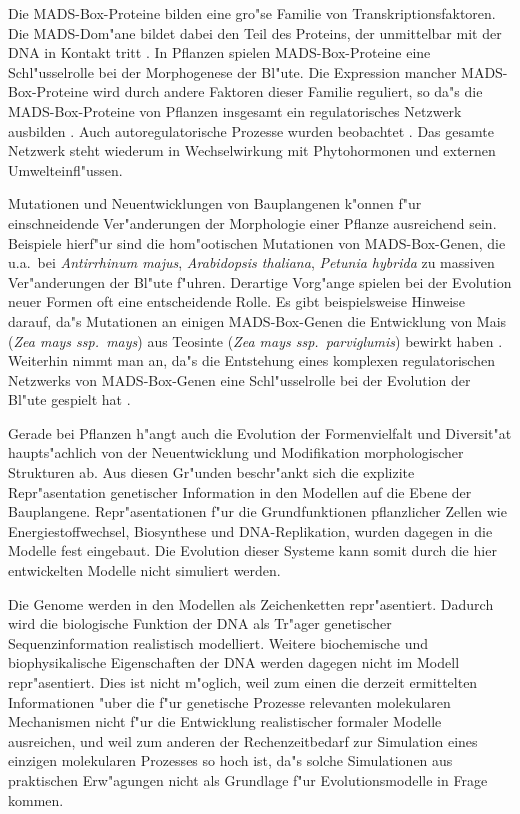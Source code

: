 Die MADS-Box-Proteine bilden eine gro"se Familie von Transkriptionsfaktoren.
Die MADS-Dom"ane bildet dabei den Teil des Proteins, der unmittelbar mit der DNA in Kontakt tritt \cite{Pellegrini95}.
In Pflanzen spielen MADS-Box-Proteine eine Schl"usselrolle bei der Morphogenese der Bl"ute.
Die Expression mancher MADS-Box-Proteine wird durch andere Faktoren dieser Familie reguliert, so da"s die MADS-Box-Proteine
von Pflanzen insgesamt ein regulatorisches Netzwerk ausbilden \cite{Theissen95}. Auch autoregulatorische
Prozesse wurden beobachtet \cite{Troebner92}. Das gesamte Netzwerk steht wiederum in Wechselwirkung mit Phytohormonen und externen
Umwelteinfl"ussen.

Mutationen und Neuentwicklungen von Bauplangenen
k"onnen f"ur einschneidende Ver"anderungen der Morphologie einer Pflanze
ausreichend sein. Beispiele hierf"ur sind die hom"ootischen
Mutationen von MADS-Box-Genen, die u.a.\ bei {\slshape Antirrhinum majus},
{\slshape Arabidopsis thaliana}, {\slshape Petunia hybrida} zu massiven
Ver"anderungen der Bl"ute f"uhren.
Derartige Vorg"ange spielen bei der Evolution neuer Formen oft eine entscheidende
Rolle. Es gibt beispielsweise Hinweise darauf, da"s Mutationen an einigen
MADS-Box-Genen die Entwicklung von Mais ({\slshape Zea mays ssp.\ mays}) aus
Teosinte ({\slshape Zea mays ssp.\ parviglumis}) bewirkt haben \cite{Saedler94}. Weiterhin nimmt man an,
da"s die Entstehung eines komplexen regulatorischen Netzwerks von MADS-Box-Genen
eine Schl"usselrolle bei der Evolution der Bl"ute gespielt hat \cite{Theissen95}.

Gerade bei Pflanzen h"angt auch die Evolution der Formenvielfalt und Diversit"at
haupts"achlich von der Neuentwicklung und Modifikation morphologischer Strukturen
ab. Aus diesen Gr"unden beschr"ankt sich die explizite Repr"asentation genetischer
Information in den Modellen auf die Ebene der Bauplangene. Repr"asentationen f"ur die
Grundfunktionen pflanzlicher Zellen wie Energiestoffwechsel, Biosynthese und DNA-Replikation,
wurden dagegen in die Modelle fest eingebaut. Die Evolution dieser Systeme kann
somit durch die hier entwickelten Modelle nicht simuliert werden.


Die Genome werden in den Modellen als Zeichenketten repr"asentiert. Dadurch
wird die biologische Funktion der DNA als Tr"ager genetischer Sequenzinformation
realistisch modelliert. Weitere biochemische und biophysikalische Eigenschaften
der DNA werden dagegen nicht im Modell repr"asentiert. Dies ist nicht m"oglich, weil
zum einen die derzeit ermittelten Informationen "uber die f"ur genetische Prozesse
relevanten molekularen Mechanismen nicht f"ur die Entwicklung realistischer formaler
Modelle ausreichen, und weil zum anderen der Rechenzeitbedarf zur Simulation eines
einzigen molekularen Prozesses so hoch ist, da"s solche Simulationen aus
praktischen Erw"agungen nicht als Grundlage f"ur Evolutionsmodelle in Frage kommen.

